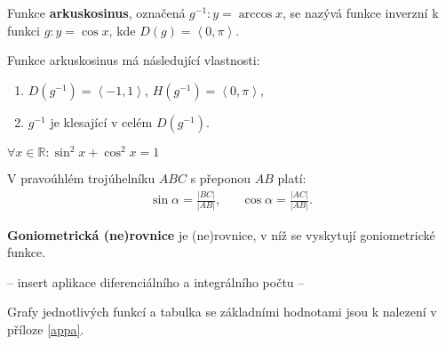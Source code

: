 \begin{definition}[Arkuskosinus]
Funkce \textbf{arkuskosinus}, označená $g^{-1}: y=\arccos x$, se nazývá funkce inverzní
k funkci $g: y=\cos x$, kde $D(g)=\left < 0,\pi \right >$.
\end{definition}
\begin{pozn}
Funkce arkuskosinus má následující vlastnosti:
\begin{enumerate}
    \item $D(g^{-1}) = \left < -1, 1 \right >$, $H(g^{-1}) = \left < 0, \pi \right >,$
    \item $g^{-1}$ je klesající v celém $D(g^{-1}).$
\end{enumerate}
\end{pozn}

\begin{veta}
  $\forall x \in \mathbb{R}:\sin^2 x + \cos^2 x = 1$
\end{veta}

\begin{veta}
    V pravoúhlém trojúhelníku $ABC$ s přeponou $AB$ platí:
    \begin{align*}
        \sin \alpha = \frac{ |BC| }{ |AB| }, & & \cos \alpha = \frac{|AC|}{|AB|}.
    \end{align*}
\end{veta}

\begin{pozn}
    \textbf{Goniometrická (ne)rovnice} je (ne)rovnice, v níž se vyskytují goniometrické funkce.
\end{pozn}

-- insert aplikace diferenciálního a integrálního počtu --

\begin{pozn}
    Grafy jednotlivých funkcí a tabulka se základními hodnotami jsou k nalezení
    v příloze \ref{appa}.
\end{pozn}
